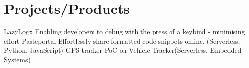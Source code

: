 \documentclass[]{twentysecondcv}
\begin{document}
\section{Projects/Products}
\begin{twentyshort}
  \twentyitemshort
  {LazyLogx}
  {Enabling developers to debug with the press of a keybind - minimising effort}
  \twentyitemshort
  {Pasteportal}
  {Effortlessly share formatted code snippets online. (Serverless, Python, JavaScript)}
  \twentyitemshort
  {GPS tracker}
  {PoC on Vehicle Tracker(Serverless, Embedded Systems) }
\end{twentyshort}
\end{document}
